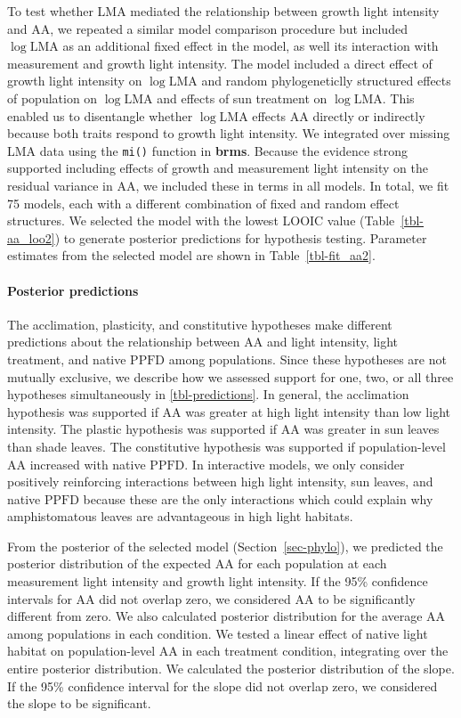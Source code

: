 \documentclass[
  letterpaper,
  DIV=11,
  numbers=noendperiod]{scrartcl}
\let\oldparagraph\paragraph
\renewcommand{\paragraph}[1]{\oldparagraph{#1}\mbox{}}
\newcommand{\aax}{$\mathrm{AA}$}
\newcommand{\ppfd}{$\mathrm{PPFD}$}
\begin{document}
To test whether LMA mediated the relationship between growth light
intensity and \aax{}, we repeated a similar model comparison procedure
but included \(\log \mathrm{LMA}\) as an additional fixed effect in the
model, as well its interaction with measurement and growth light
intensity. The model included a direct effect of growth light intensity
on \(\log \mathrm{LMA}\) and random phylogeneticlly structured effects
of population on \(\log \mathrm{LMA}\) and effects of sun treatment on
\(\log \mathrm{LMA}\). This enabled us to disentangle whether
\(\log \mathrm{LMA}\) effects \aax{} directly or indirectly because both
traits respond to growth light intensity. We integrated over missing LMA
data using the \texttt{mi()} function in \textbf{brms}. Because the
evidence strong supported including effects of growth and measurement
light intensity on the residual variance in \(\mathrm{AA}\), we included
these in terms in all models. In total, we fit 75 models, each with a
different combination of fixed and random effect structures. We selected
the model with the lowest LOOIC value (Table~\ref{tbl-aa_loo2}) to
generate posterior predictions for hypothesis testing. Parameter
estimates from the selected model are shown in Table~\ref{tbl-fit_aa2}.

\paragraph{Posterior predictions}\label{sec-predictions}

The acclimation, plasticity, and constitutive hypotheses make different
predictions about the relationship between \aax{} and light intensity,
light treatment, and native \ppfd{} among populations. Since these
hypotheses are not mutually exclusive, we describe how we assessed
support for one, two, or all three hypotheses simultaneously in
\autoref{tbl-predictions}. In general, the acclimation hypothesis was
supported if \aax{} was greater at high light intensity than low light
intensity. The plastic hypothesis was supported if \aax{} was greater in
sun leaves than shade leaves. The constitutive hypothesis was supported
if population-level \aax{} increased with native \ppfd. In interactive
models, we only consider positively reinforcing interactions between
high light intensity, sun leaves, and native \ppfd{} because these are
the only interactions which could explain why amphistomatous leaves are
advantageous in high light habitats.

From the posterior of the selected model (Section~\ref{sec-phylo}), we
predicted the posterior distribution of the expected \aax{} for each
population at each measurement light intensity and growth light
intensity. If the 95\% confidence intervals for \aax{} did not overlap
zero, we considered \aax{} to be significantly different from zero. We
also calculated posterior distribution for the average \aax{} among
populations in each condition. We tested a linear effect of native light
habitat on population-level \aax{} in each treatment condition,
integrating over the entire posterior distribution. We calculated the
posterior distribution of the slope. If the 95\% confidence interval for
the slope did not overlap zero, we considered the slope to be
significant.
\end{document}
